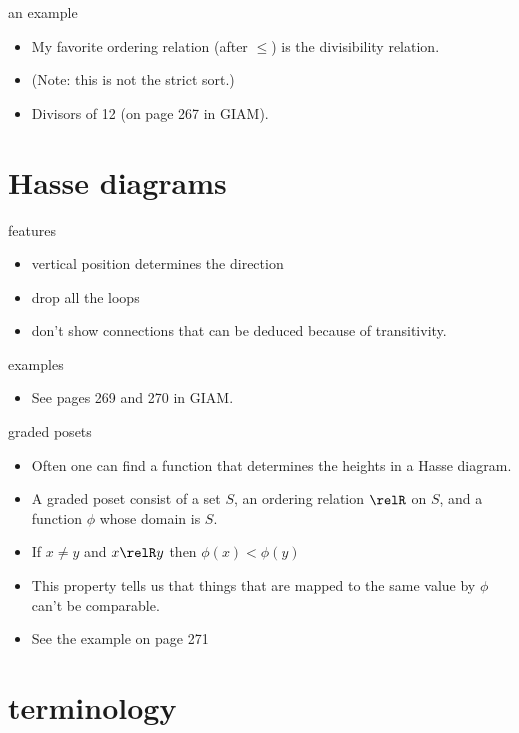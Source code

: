 \documentclass[handout,landscape]{beamer}
\begin{document}
\begin{frame}{an example}
\begin{itemize}
\item My favorite ordering relation (after $\leq$) is the divisibility relation. \pause
\item (Note: this is not the strict sort.)\pause
\item Divisors of 12 (on page 267 in GIAM).
\end{itemize}
\end{frame}

\section{Hasse diagrams}

\begin{frame}{features}
\begin{itemize}
\item vertical position determines the direction\pause
\item drop all the loops\pause
\item don't show connections that can be deduced because of transitivity.
\end{itemize}
\end{frame}

\begin{frame}{examples}
\begin{itemize}
\item See pages 269 and 270 in GIAM.
\end{itemize}
\end{frame}

\begin{frame}{graded posets}
\begin{itemize}
\item Often one can find a function that determines the heights in a Hasse diagram.\pause
\item A graded poset consist of a set $S$, an ordering relation $\relR$ on $S$, and a function $\phi$ whose domain is $S$.\pause
\item If $x \neq y$ and $x \relR y$ then $\phi(x) < \phi(y)$ \pause
\item This property tells us that things that are mapped to the same value by $\phi$ can't be comparable.\pause
\item See the example on page 271
\end{itemize}
\end{frame}

\section{terminology}
\end{document}
